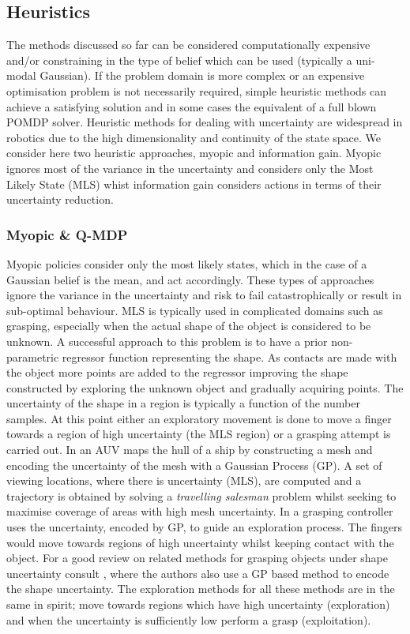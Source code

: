 \subsection{Heuristics}\label{lit:heuristics}

The methods discussed so far can be considered computationally expensive and/or constraining in the type 
of belief which can be used (typically a uni-modal Gaussian). If the problem domain is more complex or 
an expensive optimisation problem is not necessarily required, simple heuristic methods can achieve a satisfying solution 
and in some cases the equivalent of a full blown POMDP solver. Heuristic methods for dealing with uncertainty are widespread in robotics
due to the high dimensionality and continuity of the state space. We consider here two heuristic approaches,
myopic and information gain. Myopic ignores most of the variance in the uncertainty and considers only the 
Most Likely State (MLS) whist information gain considers actions in terms of their uncertainty reduction.

\subsubsection{Myopic \& Q-MDP}

Myopic policies consider only the most likely states, which in the case of a Gaussian belief is the mean, and act accordingly. These types of approaches 
ignore the variance in the uncertainty and risk to fail catastrophically or result in sub-optimal behaviour. MLS is typically used in complicated domains such as grasping, especially when the actual 
shape of the object is considered to be unknown. A successful approach to this problem is to have a prior non-parametric regressor function representing the shape. 
As contacts are made with the object more points are added to the regressor improving the shape constructed by exploring the unknown object 
and gradually acquiring points. The uncertainty of the shape in a region is typically a function of the number samples. At this point either
an exploratory movement is done to move a finger towards a region of high uncertainty (the MLS region) or a grasping attempt is carried out. 
In \cite{un_water_inspection_icra_2012} an AUV maps the hull of a ship by constructing a mesh and encoding the uncertainty of the mesh with a Gaussian Process (GP). 
A set of viewing locations, where there is uncertainty (MLS), are computed and a trajectory is obtained by solving a \textit{travelling salesman} problem 
whilst seeking to maximise coverage of areas with high mesh uncertainty. In \cite{u_aware_grasp_ICRA_2015} a grasping controller uses the uncertainty, encoded by GP, to guide an exploration process. The fingers would move towards regions of high uncertainty whilst keeping contact with the object. For a good review on related methods for grasping objects under shape uncertainty consult \cite{Li_2015}, where the authors also use a GP based method to encode the shape uncertainty. 
The exploration methods for all these methods are in the same in spirit; move towards 
regions which have high uncertainty (exploration) and when the uncertainty is sufficiently low perform a grasp (exploitation).



